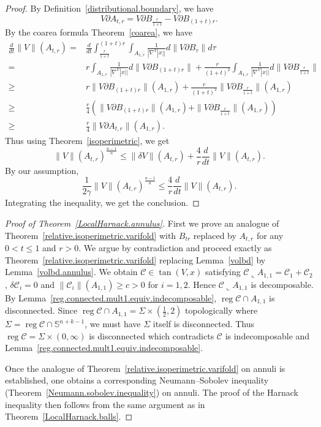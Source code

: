\documentclass[11pt]{amsart}
\theoremstyle{definition}
\newcommand{\C}{\mathcal{C}}
\newcommand{\SSS}{\mathbb{S}}
\DeclareMathOperator{\reg}{reg}
\begin{document}
\begin{proof}
	By Definition~\ref{distributional.boundary}, we have
	\[  V\partial A_{t,r}=V\partial B_{\frac{r}{1+t}}-V\partial B_{(1+t)r}.\]
	By the coarea formula Theorem~\ref{coarea}, we have
	\[
	\begin{aligned}
		\frac{d}{dt}\|V\|(A_{t,r})=&\frac{d}{dt}\int_{\frac{r}{1+t}}^{(1+t)r} \int _{A_{1,r}}\frac{1}{|\nabla ^V|x||}d\|V\partial B_{\tau}\|d\tau\\
		= &r\int_{A_{1,r}} \frac{1}{|\nabla ^V|x||}d\|V\partial B_{(1+t)r}\| + \frac{r}{(1+t)^2}\int_{A_{1,r}} \frac{1}{|\nabla ^V|x||}d\|V\partial B_{\frac{r}{1+t}}\|\\
		\ge& r\|V\partial B_{(1+t)r}\|(A_{1,r}) +\frac{r}{(1+t)^2}\|V\partial B_{\frac{r}{1+t}}\|(A_{1,r})\\
		\ge &\frac{r}{4}\left(\|V\partial B_{(1+t)r}\|(A_{1,r}) +\|V\partial B_{\frac{r}{1+t}}\|(A_{1,r})\right)\\
        \ge&\frac{r}{4} \|V\partial A_{t,r}\|(A_{1,r}).
	\end{aligned}
	\]
	Thus using Theorem~\ref{isoperimetric}, we get
	\[\|V\|(A_{t,r})^{\frac{n-1}{n}}\le \|\delta V\|(A_{t,r})+\frac{4}{r}\frac{d}{dt}\|V\|(A_{t,r}).\]
	By our assumption,
	\[\frac{1}{2\gamma}\|V\|(A_{t,r})^{\frac{n-1}{n}}\le \frac{4}{r}\frac{d}{dt}\|V\|(A_{t,r}).\]
	Integrating the inequality, we get the conclusion.
\end{proof}
\begin{proof}[Proof of Theorem~\ref{LocalHarnack.annulus}]
    First we prove an analogue of Theorem~\ref{relative.isoperimetric.varifold} with $B_{tr}$ replaced by $A_{t,r}$ for any $0<t\le 1$ and $r>0$. We argue by contradiction and proceed exactly as Theorem~\ref{relative.isoperimetric.varifold} replacing Lemma~\ref{volbd} by Lemma~\ref{volbd.annulus}. We obtain $\C\in\tan(V,x)$ satisfying $\C\llcorner A_{1,1}=\C_1+\C_2$,  $\delta\C_i=0$ and $\|\C_i\|(A_{1,1})\ge c>0$ for $i=1,2$. Hence $\C\llcorner A_{1,1}$ is decomposable. By Lemma~\ref{reg.connected.mult1.equiv.indecomposable}, $\reg \C\cap A_{1,1}$ is disconnected. Since $\reg \C\cap A_{1,1}=\Sigma\times (\frac{1}{2},2)$ topologically where $\Sigma=\reg \C\cap \SSS^{n+k-1}$, we must have $\Sigma$ itself is disconnected. Thus $\reg \C=\Sigma\times (0,\infty)$ is disconnected which contradicts $\C$ is indecomposable and Lemma~\ref{reg.connected.mult1.equiv.indecomposable}.

    Once the analogue of Theorem~\ref{relative.isoperimetric.varifold} on annuli is established, one obtains a corresponding Neumann--Sobolev inequality (Theorem~\ref{Neumann.sobolev.inequality}) on annuli. The proof of the Harnack inequality then follows from the same argument as in Theorem~\ref{LocalHarnack.balls}.
\end{proof}
\end{document}
